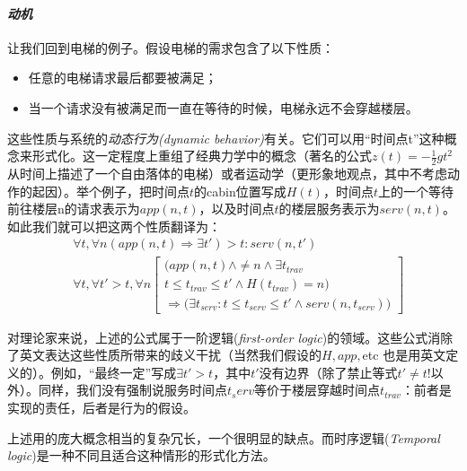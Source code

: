 \documentclass{book}
\begin{document}
    \paragraph{{\itshape 动机}} 让我们回到电梯的例子。假设电梯的需求包含了以下性质：
    \begin{itemize}
      \item 任意的电梯请求最后都要被满足；
      \item 当一个请求没有被满足而一直在等待的时候，电梯永远不会穿越楼层。
    \end{itemize}

    这些性质与系统的{\itshape 动态行为(dynamic behavior)}有关。它们可以用“时间点t”这种概念来形式化。这一定程度上重组了经典力学中的概念（著名的公式$z(t)=-\frac{1}{2}gt^2$从时间上描述了一个自由落体的电梯）或者运动学（更形象地观点，其中不考虑动作的起因）。举个例子，把时间点$t$的cabin位置写成$H(t)$，时间点$t$上的一个等待前往楼层n的请求表示为$app(n,t)$，以及时间点$t$的楼层服务表示为$serv(n,t)$。如此我们就可以把这两个性质翻译为：
    \begin{equation*}
      \begin{aligned}
      & \forall{t},\forall{n}(app(n,t) \Rightarrow \exists{t'})>t:serv(n,t') \\
      & \forall{t},\forall{t'}>t,\forall{n}\begin{bmatrix}
                                             \bigg( app(n,t) \wedge \neq n \wedge \exists{t_{trav}} \\
                                             t \leq t_{trav} \leq t' \wedge H(t_{trav})=n\bigg) \\
                                             \Rightarrow \bigg(\exists{t_{serv}}:t \leq t_{serv} \leq t' \wedge serv(n,t_{serv})\bigg)
                                           \end{bmatrix}
      \end{aligned}
    \end{equation*}

    对理论家来说，上述的公式属于一阶逻辑({\itshape first-order logic})的领域。这些公式消除了英文表达这些性质所带来的歧义干扰（当然我们假设的$H, app,$etc 也是用英文定义的）。例如，“最终一定”写成$\exists{t'}>t$，其中$t'$没有边界（除了禁止等式$t' \neq t!$以外）。同样，我们没有强制说服务时间点$t_serv$等价于楼层穿越时间点$t_{trav}$：前者是实现的责任，后者是行为的假设。

    上述用的庞大概念相当的复杂冗长，一个很明显的缺点。而时序逻辑({\itshape Temporal logic})是一种不同且适合这种情形的形式化方法。
\end{document}
